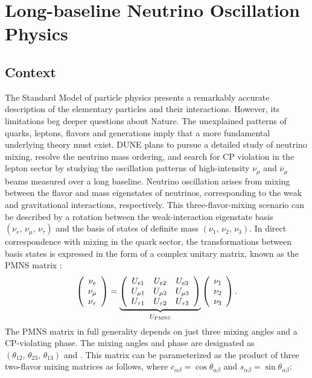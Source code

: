 \chapter{Long-baseline Neutrino Oscillation Physics}
\label{ch:physics-lbnosc}

\section{Context}
\label{sec:physics-lbnosc-context}

The Standard Model of particle physics 
presents a remarkably accurate
description of the elementary particles and their
interactions. However, its limitations beg deeper questions about
Nature. The unexplained patterns of quarks, leptons, flavors and
generations imply that a more fundamental underlying theory must
exist.  
DUNE plans to pursue a detailed
study of neutrino mixing, resolve the neutrino mass ordering,
and search for CP violation in the lepton sector by
studying the oscillation patterns of high-intensity
$\nu_\mu$ and $\overline{\nu}_\mu$ beams measured over a long baseline. 
Neutrino oscillation arises from mixing between the flavor and mass eigenstates of neutrinos,
corresponding to the weak and gravitational interactions, respectively. 
This three-flavor-mixing
scenario can be described by a rotation between the weak-interaction
eigenstate basis $(\nu_e,\, \nu_\mu,\, \nu_\tau)$ and the basis of
states of definite mass $(\nu_1,\, \nu_2,\, \nu_3)$.  In direct
correspondence with mixing in the quark sector, the transformations
between basis states is expressed in the form of a complex unitary
matrix, known as the PMNS matrix :
\begin{equation}
\left(\begin{array}{ccc} \nu_e \\ \nu_\mu \\ \nu_\tau \end{array} \right)= 
\underbrace{
  \left(\begin{array}{ccc}
      U_{e 1} &  U_{e 2} & U_{e 3} \\ 
      U_{\mu1} &  U_{\mu2} & U_{\mu 3} \\ 
      U_{\tau 1} &  U_{\tau 2} & U_{\tau 3} 
    \end{array} \right)
}_{U_{\rm PMNS}} \left(\begin{array}{ccc} \nu_1 \\ \nu_2 \\ \nu_3 \end{array} \right).
\label{eqn:pmns0}
\end{equation}
The PMNS matrix in full generality depends on just three mixing angles
and a CP-violating phase.  The mixing angles and phase are designated
as $(\theta_{12},\, \theta_{23},\, \theta_{13})$ and
\deltacp.  %
This matrix can be parameterized as the product of three
two-flavor mixing matrices as follows, where $c_{\alpha \beta}=\cos \theta_{\alpha \beta}$ and $s_{\alpha
  \beta}=\sin \theta_{\alpha \beta}$:

